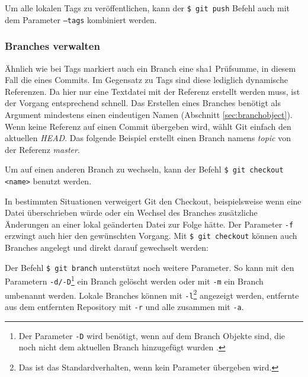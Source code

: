 
Um alle lokalen Tags zu veröffentlichen, kann der \texttt{\$ git push} Befehl auch mit
dem Parameter \texttt{--tags} kombiniert werden. \cite[70-71,162-163]{gitosp}


\subsubsection{Branches verwalten}
Ähnlich wie bei Tags markiert auch ein Branch eine \gls{sha1} Prüfsumme, in
diesem Fall die eines Commits. Im Gegensatz zu Tags sind diese lediglich
dynamische Referenzen. Da hier nur eine Textdatei mit der Referenz erstellt
werden muss, ist der Vorgang entsprechend schnell. Das Erstellen eines
Branches benötigt als Argument mindestens einen eindeutigen Namen (Abschnitt
\ref{sec:branchobject}). Wenn keine Referenz auf einen Commit übergeben wird,
wählt Git einfach den aktuellen \textit{\gls{HEAD}}. Das folgende Beispiel
erstellt einen Branch namens \textit{topic} von der Referenz \textit{master}.


Um auf einen anderen Branch zu wechseln, kann der Befehl \texttt{\$ git checkout
<name>} benutzt werden.

In bestimmten Situationen verweigert Git den Checkout, beispielsweise wenn eine
Datei überschrieben würde oder ein Wechsel des Branches zusätzliche Änderungen
an einer lokal geänderten Datei zur Folge hätte. Der Parameter \texttt{-f}
erzwingt auch hier den gewünschten Vorgang. Mit \texttt{\$ git checkout} können
auch Branches angelegt und direkt darauf gewechselt werden:


Der Befehl \texttt{\$ git branch} unterstützt noch weitere Parameter. So kann
mit den Parametern \texttt{-d/-D}\footnote{Der Parameter \texttt{-D} wird
benötigt, wenn auf dem Branch Objekte sind, die noch nicht dem aktuellen Branch
hinzugefügt wurden \cite[67]{gitosp}.} ein Branch gelöscht werden oder mit
\texttt{-m} ein Branch umbenannt werden. Lokale Branches können mit
\texttt{-l}\footnote{Das ist das Standardverhalten, wenn kein Parameter
übergeben wird.} angezeigt werden, entfernte aus dem entfernten Repository mit
\texttt{-r} und alle zusammen mit \texttt{-a}. \cite[65-67]{gitosp}

